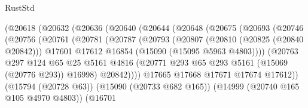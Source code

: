 \begin{lexlean}{RustStd}
\begin{coremodule}
                            (@20618
                              (@20632
                                (@20636
                                  (@20640
                                    (@20644
                                      (@20648
                                        (@20675
                                          (@20693
                                            (@20746
                                              (@20756
                                                (@20761
                                                  (@20781
                                                    (@20787
                                                      (@20793
                                                        (@20807
                                                          (@20810 (@20825 (@20840 @20842)))
                                                          @17601
                                                          @17612
                                                          @16854
                                                          (@15090 (@15095 @5963 @4803))))
                                                      (@20763
                                                        @297
                                                        @124
                                                        @65
                                                        @25
                                                        @5161
                                                        @4816
                                                        (@20771
                                                          @293
                                                          @65
                                                          @293
                                                          @5161
                                                          (@15069 (@20776 @293))
                                                          @16998)
                                                        @20842))))
                                                @17665
                                                @17668
                                                @17671
                                                @17674
                                                @17612))
                                            (@15794 (@20728 @63))
                                            (@15090 (@20733 @682 @165))
                                            (@14999 (@20740 @165 @105 @4970 @4803))
                                            (@16701

\end{coremodule}
\end{lexlean}
